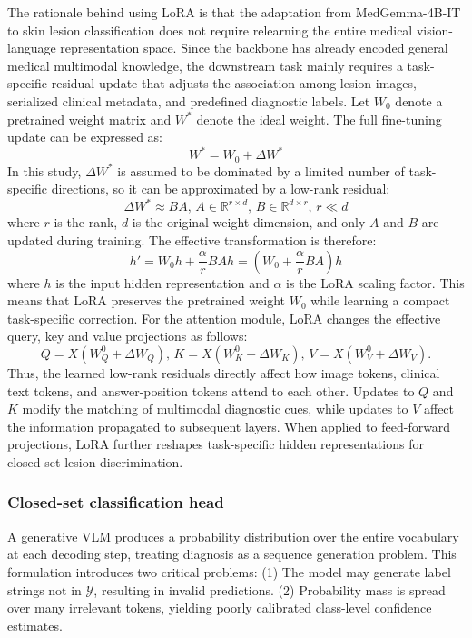 \documentclass[preprint,12pt]{elsarticle}
\makeatletter
\def@NAT@last@yr{--\NAT@penalty}%
\makeatother
\begin{document}
The rationale behind using LoRA is that the adaptation from MedGemma-4B-IT to skin lesion classification does not require relearning the entire medical vision-language representation space. Since the backbone has already encoded general medical multimodal knowledge, the downstream task mainly requires a task-specific residual update that adjusts the association among lesion images, serialized clinical metadata, and predefined diagnostic labels. Let $W_0$ denote a pretrained weight matrix and $W^*$ denote the ideal weight. The full fine-tuning update can be expressed as:
\begin{equation}
W^* = W_0 + \Delta W^*
\end{equation}
In this study, $\Delta W^*$ is assumed to be dominated by a limited number of task-specific directions, so it can be approximated by a low-rank residual:
\begin{equation}
\Delta W^* \approx BA, \, A \in \mathbb{R}^{r \times d}, \, B \in \mathbb{R}^{d \times r}, \, r \ll d
\end{equation}
where $r$ is the rank, $d$ is the original weight dimension, and only $A$ and $B$ are updated during training. The effective transformation is therefore:
\begin{equation}
h' = W_{0}h
+\frac{\alpha}{r}BAh
=
\left(
W_{0}+\frac{\alpha}{r}BA
\right)h
\end{equation}
where $h$ is the input hidden representation and $\alpha$ is the LoRA scaling factor. This means that LoRA preserves the pretrained weight $W_0$ while learning a compact task-specific correction. For the attention module, LoRA changes the effective query, key and value projections as follows:
\begin{equation}
	Q = X \left( W_{Q}^{0} + \Delta W_{Q} \right), \,
	K = X \left( W_{K}^{0} + \Delta W_{K} \right), \,
	V = X \left( W_{V}^{0} + \Delta W_{V} \right).
\end{equation}
Thus, the learned low-rank residuals directly affect how image tokens, clinical text tokens, and answer-position tokens attend to each other. Updates to $Q$ and $K$ modify the matching of multimodal diagnostic cues, while updates to $V$ affect the information propagated to subsequent layers. When applied to feed-forward projections, LoRA further reshapes task-specific hidden representations for closed-set lesion discrimination.

\subsubsection{Closed-set classification head}
A generative VLM produces a probability distribution over the entire vocabulary at each decoding step, treating diagnosis as a sequence generation problem. This formulation introduces two critical problems: (1) The model may generate label strings not in $\mathcal{Y}$, resulting in invalid predictions. (2) Probability mass is spread over many irrelevant tokens, yielding poorly calibrated class-level confidence estimates.
\end{document}
